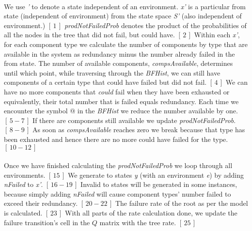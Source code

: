 \documentclass[12pt]{article}
\newcommand{\citeLine}[1]{$[\,#1\,]$}
\newcommand{\citeBlock}[2]{$[\,#1 - #2\,]$}
\begin{document}
\paragraph{} We use \textit{'} to denote a state independent of an environment. \textit{x'} is a particular from state (independent of environment) from the state space \textit{S'} (also independent of environment.) \citeLine{1} \textit{prodNotFailedProb} denotes the product of the probabilities of all the nodes in the tree that did not fail, but could have. \citeLine{2} Within each \textit{x'}, for each component type we calculate the number of components by type that are available in the system as redundancy minus the number already failed in the from state. The number of available components, \textit{compsAvailable}, determines until which point, while traversing through the \textit{BFHist}, we can still have components of a certain type that could have failed but did not fail. \citeLine{4} We can have no more components that \textit{could} fail when they have been exhausted or equivalently, their total number that is failed equals redundancy. Each time we encounter the symbol @ in the \textit{BFHist} we reduce the number available by one. \citeBlock{5}{7} If there are components still available we update \textit{prodNotFailedProb}. \citeBlock{8}{9} As soon as \textit{compsAvailable} reaches zero we break because that type has been exhausted and hence there are no more could have failed for the type. \citeBlock{10}{12}

\paragraph{} Once we have finished calculating the \textit{prodNotFailedProb} we loop through all environments. \citeLine{15} We generate to states \textit{y} (with an environment \textit{e}) by adding \textit{nFailed} to \textit{x'}. \citeBlock{16}{19} Invalid to states will be generated in some instances, because simply adding \textit{nFailed} will cause component types' number failed to exceed their redundancy. \citeBlock{20}{22} The failure rate of the root as per the model is calculated. \citeLine{23} With all parts of the rate calculation done, we update the failure transition's cell in the $Q$ matrix with the tree rate. \citeLine{25}
\end{document}
